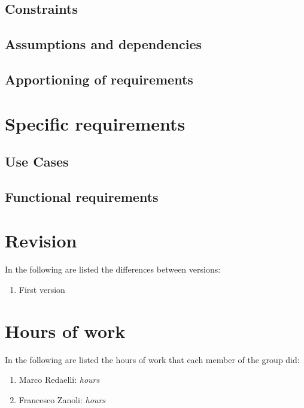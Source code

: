 \documentclass[]{report}
\begin{document}
\section{Constraints}

\section{Assumptions and dependencies}

\section{Apportioning of requirements}

\chapter{Specific requirements}


\section{Use Cases}


\section{Functional requirements}




\appendix

\chapter*{Revision}
In the following are listed the differences between versions:
\begin{enumerate}
	\item First version
\end{enumerate}

\chapter*{Hours of work}
In the following are listed the hours of work that each member of the group did:
\begin{enumerate}
	\item Marco Redaelli:  \emph{hours}
	\item Francesco Zanoli: \emph{hours}
\end{enumerate}
\end{document}

